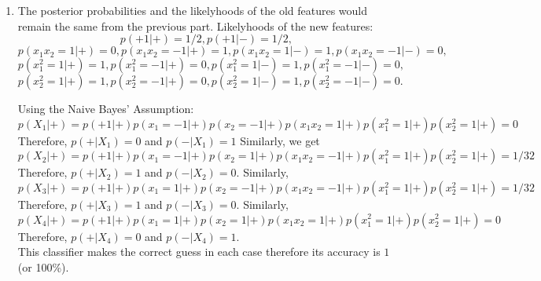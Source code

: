 \documentclass[twoside]{article}
\begin{document}
\begin{enumerate}
    \item
    The posterior probabilities and the likelyhoods of the old features would remain the same from the previous part. Likelyhoods of the new features:
    \begin{equation*}
        p(+1|+) = 1/2, p(+1|-) = 1/2,
    \end{equation*}
    \begin{equation*}
        p(x_1x_2 = 1|+) = 0, p(x_1x_2 = -1|+) = 1, p(x_1x_2 = 1|-) = 1, p(x_1x_2 = -1|-) = 0,
    \end{equation*}
    \begin{equation*}
        p(x_1^2 = 1|+) = 1, p(x_1^2 = -1|+) = 0, p(x_1^2 = 1|-) = 1, p(x_1^2 = -1|-) = 0,
    \end{equation*}
        \begin{equation*}
        p(x_2^2 = 1|+) = 1, p(x_2^2 = -1|+) = 0, p(x_2^2 = 1|-) = 1, p(x_2^2 = -1|-) = 0.
    \end{equation*}
    
    Using the Naive Bayes' Assumption:
    \begin{equation*}
        p(X_1|+) = p(+1|+)p(x_1=-1|+)p(x_2=-1|+)p(x_1x_2=1|+)p(x_1^2=1|+)p(x_2^2=1|+) = 0
    \end{equation*}
    Therefore, $p(+|X_1) = 0$ and $p(-|X_1) = 1$
    Similarly, we get
    \begin{equation*}
         p(X_2|+) = p(+1|+)p(x_1=-1|+)p(x_2=1|+)p(x_1x_2=-1|+)p(x_1^2=1|+)p(x_2^2=1|+) = 1/32
    \end{equation*}
    Therefore, $p(+|X_2) = 1$ and $p(-|X_2) = 0$.
    Similarly,
    \begin{equation*}
        p(X_3|+) = p(+1|+)p(x_1=1|+)p(x_2=-1|+)p(x_1x_2=-1|+)p(x_1^2=1|+)p(x_2^2=1|+) = 1/32
    \end{equation*}
    Therefore, $p(+|X_3) = 1$ and $p(-|X_3) = 0$.
    Similarly,
    \begin{equation*}
        p(X_4|+) = p(+1|+)p(x_1=1|+)p(x_2=1|+)p(x_1x_2=1|+)p(x_1^2=1|+)p(x_2^2=1|+) = 0
    \end{equation*}
    Therefore, $p(+|X_4) = 0$ and $p(-|X_4) = 1$.\\
    This classifier makes the correct guess in each case therefore its accuracy is $1$ (or 100\%).
    

\end{enumerate}
\end{document}
